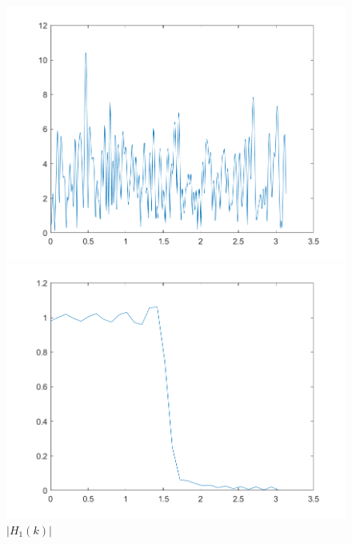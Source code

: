 \documentclass{../source/zjureport}
\begin{document}
            
            \begin{figure}[H]
                \centering
                \begin{minipage}[H]{0.32\textwidth}
                    \centering
                    \includegraphics[width=\textwidth]{figure/X(k).png}
                    \caption{$|X(k)|$}
                \end{minipage}
                \begin{minipage}[H]{0.32\textwidth}
                    \centering
                    \includegraphics[width=\textwidth]{figure/H_1.png}
                    \caption{$|H_1(k)|$}
                \end{minipage}
                \begin{minipage}[H]{0.32\textwidth}

\end{minipage}
\end{figure}
\end{document}
